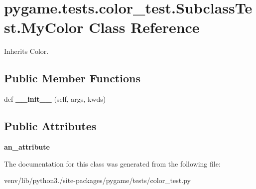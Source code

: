 \hypertarget{classpygame_1_1tests_1_1color__test_1_1_subclass_test_1_1_my_color}{}\section{pygame.\+tests.\+color\+\_\+test.\+Subclass\+Test.\+My\+Color Class Reference}
\label{classpygame_1_1tests_1_1color__test_1_1_subclass_test_1_1_my_color}


Inherits Color.

\subsection*{Public Member Functions}
\begin{DoxyCompactItemize}
\item 
\mbox{\label{classpygame_1_1tests_1_1color__test_1_1_subclass_test_1_1_my_color_acc33296c17e8073fb96c424390756b23}} 
def {\bfseries \+\_\+\+\_\+init\+\_\+\+\_\+} (self, args, kwds)
\end{DoxyCompactItemize}
\subsection*{Public Attributes}
\begin{DoxyCompactItemize}
\item 
\mbox{\label{classpygame_1_1tests_1_1color__test_1_1_subclass_test_1_1_my_color_a428d5cd08c93d9b850a7aea70c7e76be}} 
{\bfseries an\+\_\+attribute}
\end{DoxyCompactItemize}


The documentation for this class was generated from the following file\+:\begin{DoxyCompactItemize}
\item 
venv/lib/python3./site-\/packages/pygame/tests/color\+\_\+test.\+py\end{DoxyCompactItemize}
